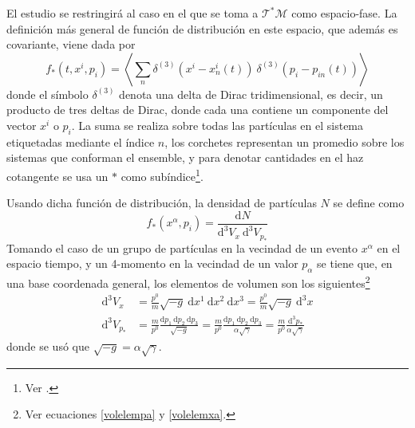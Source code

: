 \documentclass[11pt,twoside,openright,spanish]{report}
\numberwithin{equation}{chapter}
\numberwithin{figure}{chapter}
\numberwithin{table}{chapter}
\begin{document}
El estudio se restringirá al caso en el que se toma a $\mathcal{T^*M}$ como espacio-fase. La definición más general de función de distribución en este espacio, que además es covariante, viene dada por
\begin{equation}
f_*\left(t,x^i,p_i\right)=\left<\sum_n \delta^{(3)}\left(x^i-x^i_n\left(t\right)\right)\ \delta^{(3)}\left(p_i-p_{in}\left(t\right)\right)\right>
\label{grdistfunction*}
\end{equation}
donde el símbolo $\delta^{(3)}$ denota una delta de Dirac tridimensional, es decir, un producto de tres deltas de Dirac, donde cada una contiene un componente del vector $x^i$ o $p_i$. La suma se realiza sobre todas las partículas en el sistema etiquetadas mediante el índice $n$, los corchetes representan un promedio sobre los sistemas que conforman el ensemble, y para denotar cantidades en el haz cotangente se usa un $*$ como subíndice\footnote{Ver \citet{debbaschiotropdf}.}.

Usando dicha función de distribución, la densidad de partículas $N$ se define como
\begin{equation}
f_*\left(x^\alpha,p_i\right)=\frac{\text{d}N}{\text{d}^3V_x\ \text{d}^3V_{p_*}}
\end{equation} 
Tomando el caso de un grupo de partículas en la vecindad de un evento $x^\alpha$ en el espacio tiempo, y un 4-momento en la vecindad de un valor $p_\alpha$ se tiene que, en una base coordenada general, los elementos de volumen son los siguientes\footnote{Ver ecuaciones \eqref{volelempa} y \eqref{volelemxa}.}
\begin{align}
\text{d}^3V_x&=\frac{p^0}{m}\sqrt{-g}\ \text{d}x^1\ \text{d}x^2\ \text{d}x^3=\frac{p^0}{m}\sqrt{-g}\ \text{d}^3x\label{volelemx}\\
\text{d}^3V_{p_*}&=\frac{m}{p^0}\frac{\text{d}p_1\ \text{d}p_2\ \text{d}p_3}{\sqrt{-g}}=\frac{m}{p^0}\frac{\text{d}p_1\ \text{d}p_2\ \text{d}p_3}{\alpha\sqrt{\gamma}}=\frac{m}{p^0}\frac{\text{d}^3p_*}{\alpha\sqrt{\gamma}}\label{volelemp}
\end{align}
donde se usó que $\sqrt{-g}=\alpha\sqrt{\gamma}$.
\end{document}
